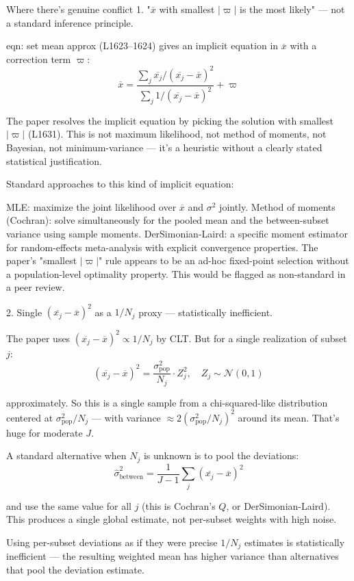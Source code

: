 \documentclass[twoside]{article}
\numberwithin{equation}{section}
\begin{document}
Where there's genuine conflict
1. "$\overline{x}$ with smallest $|\varpi|$ is the most likely" — not a standard inference principle.

eqn: set mean approx (L1623–1624) gives an implicit equation in $\overline{x}$ with a correction term $\varpi$:
$$\overline{x} = \frac{\sum_j \overline{x_j}/(\overline{x_j} - \overline{x})^2}{\sum_j 1/(\overline{x_j} - \overline{x})^2} + \varpi$$

The paper resolves the implicit equation by picking the solution with smallest $|\varpi|$ (L1631). This is not maximum likelihood, not method of moments, not Bayesian, not minimum-variance — it's a heuristic without a clearly stated statistical justification.

Standard approaches to this kind of implicit equation:

MLE: maximize the joint likelihood over $\overline{x}$ and $\sigma^2$ jointly.
Method of moments (Cochran): solve simultaneously for the pooled mean and the between-subset variance using sample moments.
DerSimonian-Laird: a specific moment estimator for random-effects meta-analysis with explicit convergence properties.
The paper's "smallest $|\varpi|$" rule appears to be an ad-hoc fixed-point selection without a population-level optimality property. This would be flagged as non-standard in a peer review.

2. Single $(\overline{x_j} - \overline{x})^2$ as a $1/N_j$ proxy — statistically inefficient.

The paper uses $(\overline{x_j} - \overline{x})^2 \propto 1/N_j$ by CLT. But for a single realization of subset $j$:
$$(\overline{x_j} - \overline{x})^2 = \frac{\sigma_{\text{pop}}^2}{N_j} \cdot Z_j^2, \quad Z_j \sim \mathcal{N}(0, 1)$$

approximately. So this is a single sample from a chi-squared-like distribution centered at $\sigma_{\text{pop}}^2/N_j$ — with variance $\approx 2(\sigma_{\text{pop}}^2/N_j)^2$ around its mean. That's huge for moderate $J$.

A standard alternative when $N_j$ is unknown is to pool the deviations:
$$\hat{\sigma}_{\text{between}}^2 = \frac{1}{J-1}\sum_j (\overline{x_j} - \overline{x})^2$$

and use the same value for all $j$ (this is Cochran's $Q$, or DerSimonian-Laird). This produces a single global estimate, not per-subset weights with high noise.

Using per-subset deviations as if they were precise $1/N_j$ estimates is statistically inefficient — the resulting weighted mean has higher variance than alternatives that pool the deviation estimate.
\end{document}
